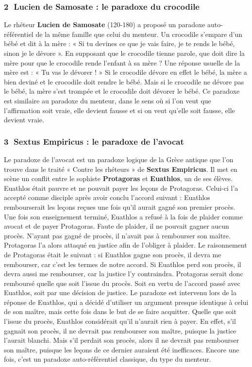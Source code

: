 \subsubsection*{\textcircled{\scriptsize 2} Lucien de Samosate : le paradoxe du crocodile}
Le rhéteur \textbf{Lucien de Samosate} (120-180) a proposé un paradoxe auto-référentiel de la même famille que celui du menteur. Un crocodile s’empare d’un bébé et dit à la mère : « Si tu devines ce que je vais faire, je te rends le bébé, sinon je le dévore ». En supposant que le crocodile tienne parole, que doit dire la mère pour que le crocodile rende l’enfant à sa mère ? Une réponse usuelle
de la mère est : « Tu vas le dévorer ! » Si le crocodile dévore en effet le bébé, la mère a bien deviné et le crocodile doit rendre le bébé. Mais si le crocodile ne dévore pas le bébé, la mère s’est trompée et le crocodile doit dévorer le bébé. Ce paradoxe est similaire au paradoxe du menteur, dans le sens où si l’on veut que l’affirmation soit vraie, elle devient fausse et si on veut qu’elle soit fausse, elle devient vraie.

\subsubsection*{\textcircled{\scriptsize 3} Sextus Empiricus : le paradoxe de l’avocat}
Le paradoxe de l’avocat est un paradoxe logique de la Grèce antique que l’on trouve dans le traité « Contre les rhéteurs » de \textbf{Sextus Empiricus}. Il met en scène un conflit entre le sophiste \textbf{Protagoras} et \textbf{Euathlos}, un de ses élèves. Euathlos était pauvre et ne pouvait payer les leçons de Protagoras. Celui-ci l’a accepté comme disciple après avoir conclu l’accord suivant : Euathlos rembourserait les leçons reçues une fois qu’il aurait gagné son premier procès. Une fois son enseignement terminé, Euathlos a refusé à la fois de plaider comme avocat et de payer Protagoras. Faute de plaider, il ne pouvait gagner aucun procès. N’ayant pas gagné de procès, il n’avait pas à rembourser son maître. Protagoras l’a alors attaqué en justice afin de l’obliger à plaider. Le raisonnement de Protagoras était le suivant : si Euathlos gagne son procès, il devra me rembourser, car c’est les termes de notre accord. Si Euathlos perd son procès, il devra aussi me rembourser, car la justice l’y contraindra. Protagoras serait donc remboursé quelle que soit l’issue du procès. Soit en vertu de l’accord passé avec Euathlos, soit par une décision de justice. Le paradoxe est intervenu lors de la réponse de Euathlos, qui a décidé d’utiliser un argument presque identique à celui de son maître, mais cette fois dans le but de se faire acquitter. Quelle que soit l’issue du procès, Euathlos considérait qu’il n’aurait rien à payer. En effet, s’il gagnait son procès, il ne devrait pas rembourser son maître, puisque la justice l’aurait blanchi. Mais s’il perdait son procès, alors il ne devrait pas rembourser son maître, puisque les leçons de ce dernier auraient été inefficaces. Encore une fois, c’est un paradoxe auto-référentiel classique, du type du menteur.

